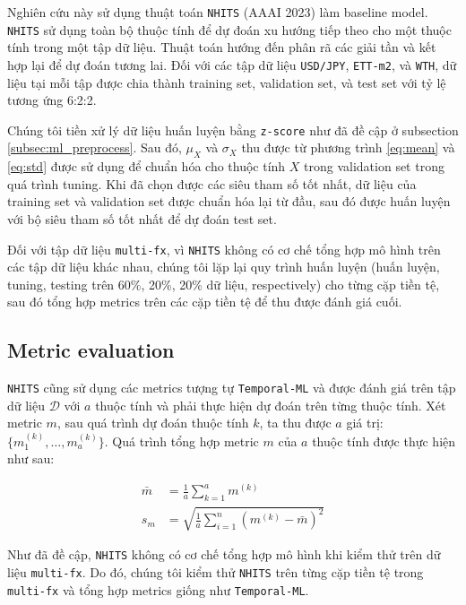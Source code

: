 Nghiên cứu này sử dụng thuật toán \verb|NHITS| (AAAI 2023) làm baseline model. \verb|NHITS| sử dụng toàn bộ thuộc tính để dự đoán xu hướng tiếp theo cho một thuộc tính trong một tập dữ liệu. Thuật toán hướng đến phân rã các giải tần và kết hợp lại để dự đoán tương lai. Đối với các tập dữ liệu \verb|USD/JPY|, \verb|ETT-m2|, và \verb|WTH|, dữ liệu tại mỗi tập được chia thành training set, validation set, và test set với tỷ lệ tương ứng 6:2:2.

Chúng tôi tiền xử lý dữ liệu huấn luyện bằng \verb|z-score| như đã đề cập ở subsection \ref{subsec:ml_preprocess}. Sau đó, $\mu_{X}$ và $\sigma_{X}$ thu được từ phương trình \ref{eq:mean} và \ref{eq:std} được sử dụng để chuẩn hóa cho thuộc tính $X$ trong validation set trong quá trình tuning. Khi đã chọn được các siêu tham số tốt nhất, dữ liệu của training set và validation set được chuẩn hóa lại từ đầu, sau đó được huấn luyện với bộ siêu tham số tốt nhất để dự đoán test set.

Đối với tập dữ liệu \verb|multi-fx|, vì \verb|NHITS| không có cơ chế tổng hợp mô hình trên các tập dữ liệu khác nhau, chúng tôi lặp lại quy trình huấn luyện (huấn luyện, tuning, testing trên 60\%, 20\%, 20\% dữ liệu, respectively) cho từng cặp tiền tệ, sau đó tổng hợp metrics trên các cặp tiền tệ để thu được đánh giá cuối.

\subsection{Metric evaluation}

\verb|NHITS| cũng sử dụng các metrics tượng tự \verb|Temporal-ML| và được đánh giá trên tập dữ liệu $\mathcal{D}$ với $a$ thuộc tính và phải thực hiện dự đoán trên từng thuộc tính. Xét metric $m$, sau quá trình dự đoán thuộc tính $k$, ta thu được $a$ giá trị: $\{m^{(k)}_1,\dots,m^{(k)}_a\}$. Quá trình tổng hợp metric $m$ của $a$ thuộc tính được thực hiện như sau:

\begin{align*}
    \bar{m} &= \frac{1}{a}\sum_{k=1}^a{m^{(k)}}\\
    s_m &= \sqrt{\frac{1}{a} \sum_{i=1}^n{(m^{(k)} - \bar{m})^2}}
\end{align*}

Như đã đề cập, \verb|NHITS| không có cơ chế tổng hợp mô hình khi kiểm thử trên dữ liệu \verb|multi-fx|. Do đó, chúng tôi kiểm thử \verb|NHITS| trên từng cặp tiền tệ trong \verb|multi-fx| và tổng hợp metrics giống như \verb|Temporal-ML|.

